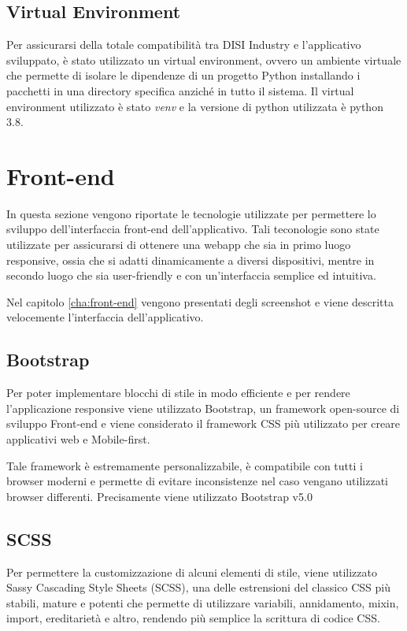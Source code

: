 \subsection{Virtual Environment}
Per assicurarsi della totale compatibilità tra DISI Industry e l'applicativo sviluppato, è stato utilizzato un virtual environment, ovvero un ambiente virtuale che permette di isolare le dipendenze di un progetto Python installando i pacchetti in una directory specifica anziché in tutto il sistema. Il virtual environment utilizzato è stato \textit{venv} \cite{venv} e la versione di python utilizzata è python 3.8.



\section{Front-end}
In questa sezione vengono riportate le tecnologie utilizzate per permettere lo sviluppo dell'interfaccia front-end dell'applicativo. Tali teconologie sono state utilizzate per assicurarsi di ottenere una webapp che sia in primo luogo responsive, ossia che si adatti dinamicamente a diversi dispositivi, mentre in secondo luogo che sia user-friendly e con un'interfaccia semplice ed intuitiva.

Nel capitolo \ref{cha:front-end} vengono presentati degli screenshot e viene descritta velocemente l'interfaccia dell'applicativo.
\subsection{Bootstrap}
Per poter implementare blocchi di stile in modo efficiente e per rendere l'applicazione responsive viene utilizzato Bootstrap, un framework open-source di sviluppo Front-end e viene considerato il framework CSS più utilizzato per creare applicativi web e Mobile-first.

Tale framework è estremamente personalizzabile, è compatibile con tutti i browser moderni e permette di evitare inconsistenze nel caso vengano utilizzati browser differenti.
Precisamente viene utilizzato Bootstrap v5.0 \cite{bootstrap}

\subsection{SCSS}
Per permettere la customizzazione di alcuni elementi di stile, viene utilizzato Sassy Cascading Style Sheets (SCSS), una delle estrensioni del classico CSS più stabili, mature e potenti che permette di utilizzare variabili, annidamento, mixin, import, ereditarietà e altro, rendendo più semplice la scrittura di codice CSS. \cite{scss}


